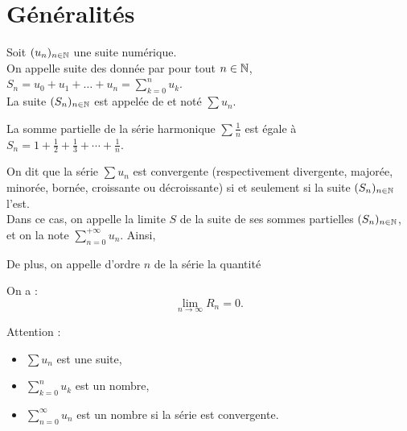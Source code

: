 \documentclass{book}
\begin{document}
\section{Généralités}


\begin{Definition}
Soit $(u_n)_{n\in\mathbb{N}}$ une suite numérique.\\
On appelle suite des  donnée par pour tout $n\in\mathbb{N}$, $S_n=u_0+u_1+\dots+u_n=\sum _{k=0}^{n}u_{k}$.\\
La suite   $(S_n)_{n\in\mathbb{N}}$ est appelée  de  et noté $\sum u_n$.
\end{Definition}
\begin{Exemple}
La somme partielle de  la série harmonique $\sum \frac 1 n$ est  égale à $S_n=1+\frac 1 2 +\frac 1 3+\cdots +\frac 1 n$. 
\end{Exemple}
\begin{Definition}
On dit que la série $\sum u_n$ est convergente (respectivement divergente, majorée, minorée, bornée, croissante ou décroissante) si et seulement si la suite $(S_n)_{n\in\mathbb{N}}$ l'est.\\
Dans ce cas, on appelle  la limite $S$ de la suite de ses sommes partielles $(S_n)_{n\in\mathbb{N}}$, et on la note $\sum_{n=0}^{+\infty} u_n$.
Ainsi, 
\begin{center}
\end{center}
De plus, on appelle  d'ordre $n$ de la série la quantité
\begin{center}
\end{center}
On a :
$$ \lim_{n\to\infty}R_n=0.$$
\end{Definition}


\begin{Remarque} Attention :
\begin{itemize}
\item $\sum u_n$ est une suite,
\item $\sum_{k=0}^n u_k$ est un nombre,
\item $\sum_{n=0}^\infty u_n$ est un nombre si la série est convergente.
\end{itemize}
\end{Remarque}
\end{document}
